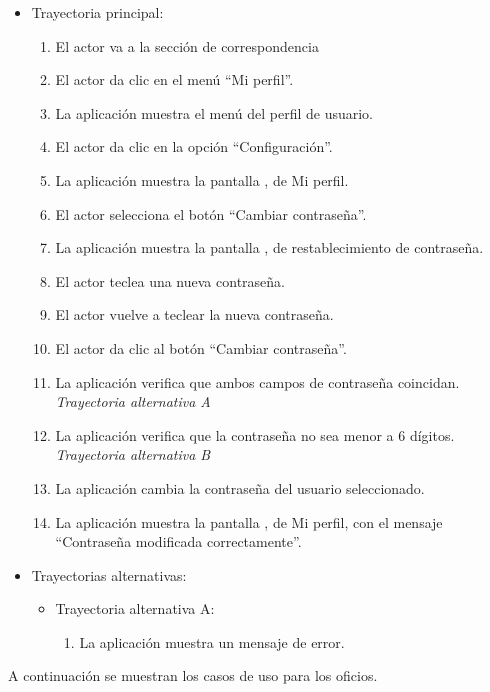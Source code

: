 			\begin{itemize}
				\item Trayectoria principal:
					\begin{enumerate}
						\item El actor va a la sección de correspondencia 
						\item El actor da clic en el menú ``Mi perfil''.
						\item La aplicación muestra el menú del perfil de usuario.
						\item El actor da clic en la opción ``Configuración''.
						\item La aplicación muestra la pantalla , de Mi perfil.
						\item El actor selecciona el botón ``Cambiar contraseña''.
						\item La aplicación muestra la pantalla , de restablecimiento de contraseña.
						\item El actor teclea una nueva contraseña.
						\item El actor vuelve a teclear la nueva contraseña.
						\item El actor da clic al botón ``Cambiar contraseña''.
						\item La aplicación verifica que ambos campos de contraseña coincidan. \textsl{Trayectoria alternativa A}
						\item La aplicación verifica que la contraseña no sea menor a 6 dígitos. \textsl{Trayectoria alternativa B}
						\item La aplicación cambia la contraseña del usuario seleccionado.
						\item La aplicación muestra la pantalla , de Mi perfil, con el mensaje ``Contraseña modificada correctamente''.
					\end{enumerate}
				\item Trayectorias alternativas:
					\begin{itemize}
						\item Trayectoria alternativa A:
							\begin{enumerate}
								\item La aplicación muestra un mensaje de error.
							\end{enumerate}
					\end{itemize}
			\end{itemize}


A continuación se muestran los casos de uso para los oficios.

